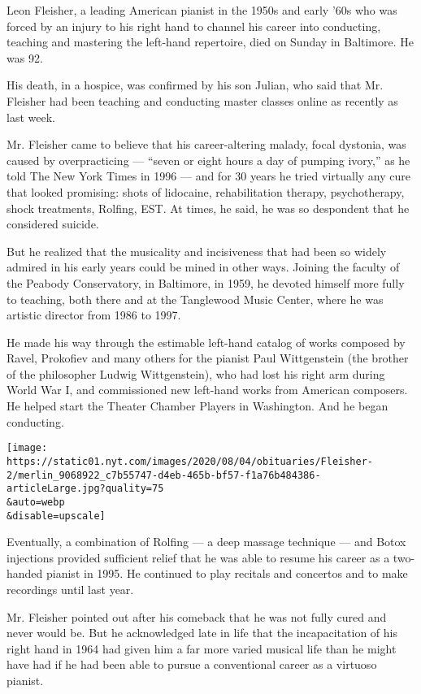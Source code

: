 Leon Fleisher, a leading American pianist in the 1950s and early '60s
who was forced by an injury to his right hand to channel his career into
conducting, teaching and mastering the left-hand repertoire, died on
Sunday in Baltimore. He was 92.

His death, in a hospice, was confirmed by his son Julian, who said that
Mr. Fleisher had been teaching and conducting master classes online as
recently as last week.

Mr. Fleisher came to believe that his career-altering malady, focal
dystonia, was caused by overpracticing --- ``seven or eight hours a day
of pumping ivory,'' as he told The New York Times in 1996 --- and for 30
years he tried virtually any cure that looked promising: shots of
lidocaine, rehabilitation therapy, psychotherapy, shock treatments,
Rolfing, EST. At times, he said, he was so despondent that he considered
suicide.

But he realized that the musicality and incisiveness that had been so
widely admired in his early years could be mined in other ways. Joining
the faculty of the Peabody Conservatory, in Baltimore, in 1959, he
devoted himself more fully to teaching, both there and at the Tanglewood
Music Center, where he was artistic director from 1986 to 1997.

He made his way through the estimable left-hand catalog of works
composed by Ravel, Prokofiev and many others for the pianist Paul
Wittgenstein (the brother of the philosopher Ludwig Wittgenstein), who
had lost his right arm during World War I, and commissioned new
left-hand works from American composers. He helped start the Theater
Chamber Players in Washington. And he began conducting.

\texttt{[image: https://static01.nyt.com/images/2020/08/04/obituaries/Fleisher-2/merlin\_9068922\_c7b55747-d4eb-465b-bf57-f1a76b484386-articleLarge.jpg?quality=75\\\&auto=webp\\\&disable=upscale]}

Eventually, a combination of Rolfing --- a deep massage technique ---
and Botox injections provided sufficient relief that he was able to
resume his career as a two-handed pianist in 1995. He continued to play
recitals and concertos and to make recordings until last year.

Mr. Fleisher pointed out after his comeback that he was not fully cured
and never would be. But he acknowledged late in life that the
incapacitation of his right hand in 1964 had given him a far more varied
musical life than he might have had if he had been able to pursue a
conventional career as a virtuoso pianist.

